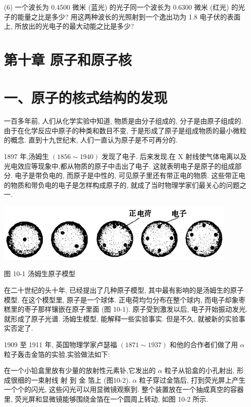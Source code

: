\documentclass[10pt]{article}
\begin{document}
(6) 一个波长为 0.4500 微米 (蓝光) 的光子同一个波长为 0.6300 微米 (红光) 的光子的能量之比是多少? 用这两种波长的光照射到一个逸出功为 1.8 电子伏的表面上, 所放出的光电子的最大动能之比是多少?

\section*{第十章 原子和原子核}

\section*{一、原子的核式结构的发现}

一百多年前, 人们从化学实验中知道, 物质是由分子组成的, 分子是由原子组成的. 由于在化学反应中原子的种类和数目不变, 于是形成了原子是组成物质的最小微粒的概念. 直到十九世纪末, 人们一直认为原子是不可再分的.

1897 年,汤姆生 \(\left( {{1856} \sim {1940}}\right)\) 发现了电子. 后来发现,在 \(\mathrm{X}\) 射线使气体电离以及光电效应等现象中,都从物质的原子中击出了电子. 这就表明电子是原子的组成部分. 电子是带负电的, 而原子是中性的, 可见原子里还有带正电的物质. 这些带正电的物质和带负电的电子是怎样构成原子的, 就成了当时物理学家们最关心的问题之一.

\begin{center}
\includegraphics[max width=0.9\textwidth]{images/01913056-1f15-74d8-9184-9aab52c9d66b_327_650732.jpg}
\end{center}

图 10-1 汤姆生原子模型

在二十世纪的头十年, 已经提出了几种原子模型, 其中最有影响的是汤姆生的原子模型. 在这个模型里, 原子是一个球体. 正电荷均匀分布在整个球内, 而电子却象枣糕里的枣子那样镶嵌在原子里面 (图 10-1). 原子受到激发以后, 电子开始振动发光. 就形成了原子光谱. 汤姆生模型, 能解释一些实验事实. 但是不久, 就被新的实验事实否定了.

1909 至 1911 年, 英国物理学家卢瑟福 \(\left( {{1871} \sim {1937}}\right)\) 和他的合作者们做了用 \(\alpha\) 粒子轰击金箔的实验,实验做法如下:

在一个小铅盒里放有少量的放射性元素钋,它发出的 \(\alpha\) 粒子从铅盒的小孔射出, 形成很细的一束射线 射 到 金 箔上 (图10-2). \(\alpha\) 粒子穿过金箔后, 打到荧光屏上产生一个个的闪光, 这些闪光可以用显微镜观察到. 整个装置放在一个抽成真空的容器里, 荧光屏和显微镜能够围绕金箔在一个圆周上转动, 如图 10-2 所示.
\end{document}
